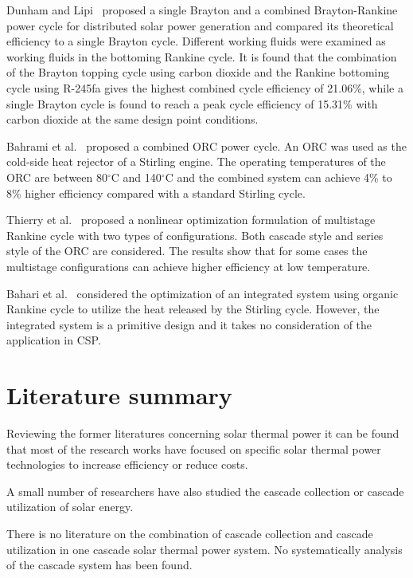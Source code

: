 Dunham and Lipi~\cite{Dunham2013} proposed a single Brayton and a combined Brayton-Rankine power cycle for distributed solar power generation and compared its theoretical efficiency to a single Brayton cycle. Different working fluids were examined as working fluids in the bottoming Rankine cycle. It is found that the combination of the Brayton topping cycle using carbon dioxide and the Rankine bottoming cycle using R-245fa gives the highest combined cycle efficiency of 21.06\%, while a single Brayton cycle is found to reach a peak cycle efficiency of 15.31\% with carbon dioxide at the same design point conditions. 

Bahrami et al.~\cite{Bahrami2013} proposed a combined ORC power cycle. An ORC was used as the cold-side heat rejector of a Stirling engine. The operating temperatures of the ORC are between 80$\mathrm{^\circ C}$ and 140$\mathrm{^\circ C}$ and the combined system can achieve 4\% to 8\% higher efficiency compared with a standard Stirling cycle.

Thierry et al.~\cite{Thierry2016} proposed a nonlinear optimization formulation of multistage Rankine cycle with two types of configurations. Both cascade style and series style of the ORC are considered. The results show that for some cases the multistage configurations can achieve higher efficiency at low temperature.

Bahari et al.~\cite{Bahari2016} considered the optimization of an integrated system using organic Rankine cycle to utilize the heat released by the Stirling cycle. However, the integrated system is a primitive design and it takes no consideration of the application in CSP.


\section{Literature summary}
Reviewing the former literatures concerning solar thermal power it can be found that most of the research works have focused on specific solar thermal power technologies to increase efficiency or reduce costs. 

A small number of researchers have also studied the cascade collection or cascade utilization of solar energy. 

There is no literature on the combination of cascade collection and cascade utilization in one cascade solar thermal power system. No systematically analysis of the cascade system has been found.

